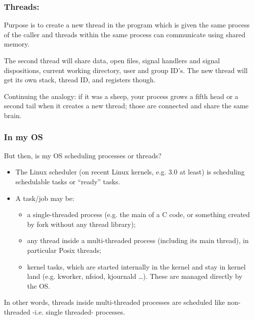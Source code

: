 \subsubsection{Threads:}
Purpose is to create a new thread in the program which is given the same process of the caller and threads within the same process can communicate using
shared memory.

The second thread will share data, open files, signal handlers
and signal dispositions, current working directory, user and
group ID's. The new thread will get its own stack, thread ID,
and registers though.

Continuing the analogy: if it was a sheep, your process grows a
fifth head or a second tail when it creates a new thread; those are
connected and share the same brain.


\subsubsection{In my OS}

But then, is my OS scheduling processes or threads?

\begin{itemize}
    \item The Linux scheduler (on recent Linux kernels, e.g. 3.0 at least) is scheduling schedulable tasks or “ready” tasks. 
    \item A task/job may be: 
        \begin{itemize}
            \item[]a single-threaded process (e.g. the main of a C code, or something
created by fork without any thread library);
            \item[] any thread inside a multi-threaded process (including its main
thread), in particular Posix threads;
            \item[] kernel tasks, which are started internally in the kernel and stay in
kernel land (e.g. kworker, nfsiod, kjournald …). These are managed directly by the OS.
        \end{itemize}
\end{itemize}

In other words, threads inside multi-threaded processes are scheduled
like non-threaded -i.e. single threaded- processes.

